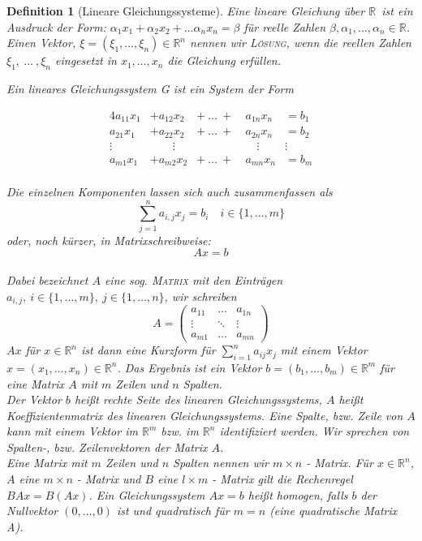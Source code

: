 \documentclass{report}
\newcommand{\IN}[1]{\index{#1|BH}}
\newcommand{\R}{\mathbb{R}}
\newcommand{\mR}{\(\mathbb{R}\)}
\newcommand{\Rn}{\mathbb{R}^n}
\theoremstyle{customrem}
\theoremstyle{customdef}
\newtheorem*{definitionn}{Definition} %
\theoremstyle{customenv}
\newcommand{\defemph}[1]{\textsc{#1}}
\begin{document}
	\begin{definitionn}[Lineare Gleichungssysteme]
		\IN{Lineare Gleichungssysteme}
		\label{deflingl}
		Eine lineare Gleichung über \mR\ ist ein Ausdruck der Form: \(\alpha_1x_1 + \alpha_2 x_2 + \dots \alpha_n x_n = \beta\) für reelle Zahlen \(\beta, \alpha_1, \dots, \alpha_n \in \R\). Einen Vektor, \(\xi = \left(\xi_1, \dots, \xi_n\right) \in \Rn\) nennen wir \defemph{Lösung}, wenn die reellen Zahlen  \(\xi_1, \ \dots\ , \xi_n\) eingesetzt in \(x_1, \dots, x_n\) die Gleichung erfüllen. \pagebreak[3]

		Ein lineares Gleichungssystem G ist ein System der Form

		\begin{alignat*}{4}
			a_{11} x_1	&+ a_{12}x_2	&+\ \dots\ +\	& a_{1n} x_n	&= b_1\\
			a_{21} x_1 	&+ a_{22}x_2 	&+\ \dots\ +\	& a_{2n} x_n	&= b_2\\
			\vdots\quad & \qquad\vdots	& 				&\quad\vdots	& \vdots\ \\
			a_{m1} x_1 	&+ a_{m2} x_2  	&+\ \dots\ +\	& a_{mn} x_n	&= b_m\\
		\end{alignat*}

		 Die einzelnen Komponenten lassen sich auch zusammenfassen als \[\sum_{j=1}^n a_{i,j} x_j = b_i \quad i\in\{1,\dots,m\}\]
		oder, noch kürzer, in Matrixschreibweise:
		\[Ax=b\]\\
		Dabei bezeichnet \(A\) eine sog. \defemph{Matrix} mit den Einträgen \(a_{i,j},\ i\in\{1, \dots , m\},\ j\in\{1, \dots, n\}\), wir schreiben\\
		\[A =
			\begin{pmatrix}
				a_{11} & \dots  & a_{1n}\\
				\vdots & \ddots & \vdots\\
				a_{m1} & \dots  & a_{mn}
			\end{pmatrix}
		\]
		\(Ax\) für \(x \in \Rn\) ist dann eine Kurzform für \(\sum_{i=1}^na_{ij}x_j\) mit einem Vektor \(x = (x_1, \dots, x_n) \in \Rn\). Das Ergebnis ist ein Vektor \(b = (b_1, \dots, b_m) \in \R^m\) für eine Matrix \(A\) mit \(m\) Zeilen und \(n\) Spalten.\\
		Der Vektor \(b\) heißt rechte Seite des linearen Gleichungssystems, \(A\) heißt Koeffizientenmatrix des linearen Gleichungssystems. Eine Spalte, bzw. Zeile von \(A\) kann mit einem Vektor im \(\R^m\) bzw. im \(\R^n\) identifiziert werden. Wir sprechen von Spalten-, bzw. Zeilenvektoren der Matrix \(A\).\\

		Eine Matrix mit \(m\) Zeilen und \(n\) Spalten nennen wir \(m\times n\) - Matrix. Für \(x  \in \Rn \), \(A\) eine \(m\times n\) - Matrix und \(B\) eine \(l\times m\) - Matrix gilt die Rechenregel \(BAx = B(Ax)\). Ein Gleichungssystem \(Ax=b\) heißt homogen, falls \(b\) der Nullvektor \((0, \dots, 0)\) ist und quadratisch für  \(m = n\) (eine quadratische Matrix A).\\
	\end{definitionn}
\end{document}
